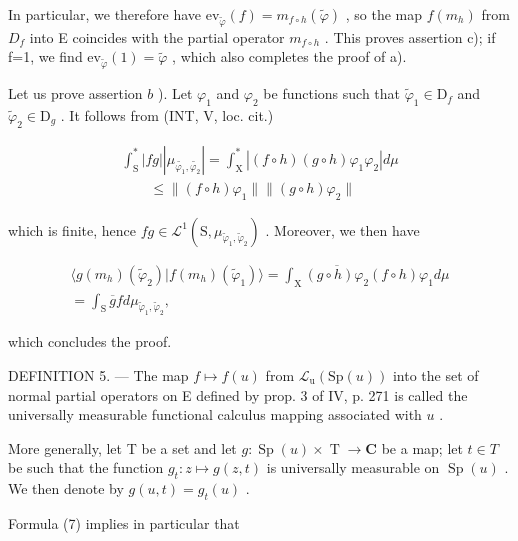 In particular, we therefore have \(\mathrm{ev}_{\widetilde{\varphi}}(f)=m_{f\circ h}(\widetilde{\varphi})\) , so the map \(f(m_{h})\) from \(D_{f}\) into E coincides with the partial operator \(m_{f\circ h}\) . This proves assertion c); if f=1, we find \(\mathrm{ev}_{\widetilde{\varphi}}(1)=\widetilde{\varphi}\) , which also completes the proof of a).

Let us prove assertion \(b\) ). Let \(\varphi_{1}\) and \(\varphi_{2}\) be functions such that \(\widetilde{\varphi}_{1} \in \mathrm{D}_{f}\) and \(\widetilde{\varphi}_{2} \in \mathrm{D}_{g}\) . It follows from (INT, V, loc. cit.)

\[
\begin{array}{l} \int_ {\mathrm{S}} ^ {*} | f g |   | \mu_ {\widetilde {\varphi_ {1}}, \widetilde {\varphi_ {2}}} | = \int_ {\mathrm{X}} ^ {*} | (f \circ h) (g \circ h) \varphi_ {1} \varphi_ {2} | d \mu \\ \qquad \leqslant \| (f \circ h) \varphi_ {1} \| \| (g \circ h) \varphi_ {2} \| \end{array}
\]

which is finite, hence \(fg \in \mathcal{L}^1(\mathrm{S}, \mu_{\widetilde{\varphi}_1, \widetilde{\varphi}_2})\) . Moreover, we then have

\[
\begin{array}{c} \langle g (m _ {h}) (\widetilde {\varphi} _ {2})   |   f (m _ {h}) (\widetilde {\varphi} _ {1}) \rangle = \int_ {\mathrm{X}} \overline {{(g \circ h)   \varphi_ {2}}}    (f \circ h)   \varphi_ {1}    d \mu \\ = \int_ {\mathrm{S}} \overline {{g}}   f    d \mu_ {\widetilde {\varphi} _ {1}, \widetilde {\varphi} _ {2}}, \end{array}
\]

which concludes the proof.

DEFINITION 5. --- The map \(f \mapsto f(u)\) from \(\mathcal{L}_{\mathrm{u}}(\mathrm{Sp}(u))\) into the set of normal partial operators on E defined by prop. 3 of IV, p. 271 is called the universally measurable functional calculus mapping associated with \(u\) .

More generally, let T be a set and let \(g\colon\operatorname{Sp}(u)\times\operatorname{T}\to\mathbf{C}\) be a map; let \(t\in T\) be such that the function \(g_{t}\colon z\mapsto g(z,t)\) is universally measurable on \(\operatorname{Sp}(u)\) . We then denote by \(g(u,t)=g_{t}(u)\) .

Formula (7) implies in particular that


